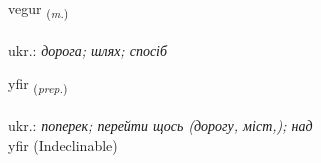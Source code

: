 \documentclass[frontgrid, backgrid]{flacards}\usepackage[]{graphicx}\usepackage[]{xcolor}
\begin{document}
\renewcommand{\flhead}{\vskip5pt \fboxsep=0pt {\small\bfseries\footnotesize Nafnorð | іменник}}
\renewcommand{\fcfoot}{\vskip5pt \fboxsep=0pt \hspace{2pt}{\small\bfseries\footnotesize 1K}}

\renewcommand{\blhead}{\vskip5pt {\small\bfseries\footnotesize Nafnorð | іменник }}
\renewcommand{\bcfoot}{\vskip5pt \hspace{2pt}{\small\bfseries\footnotesize 1K}}


{vegur \small{\textsubscript{(\textit{m.})}} \\[1ex] %
\textphonetic{[vɛːɣʏr]} \\
ukr.: \emph{дорога; шлях; спосіб} \\  [2ex]
\renewcommand*{\arraystretch}{0.8}
}


\renewcommand{\flhead}{\vskip5pt \fboxsep=0pt {\small\bfseries\footnotesize Forsetning | прийменник}}
\renewcommand{\fcfoot}{\vskip5pt \fboxsep=0pt \hspace{2pt}{\small\bfseries\footnotesize 1K}}

\renewcommand{\blhead}{\vskip5pt {\small\bfseries\footnotesize Forsetning | прийменник }}
\renewcommand{\bcfoot}{\vskip5pt \hspace{2pt}{\small\bfseries\footnotesize 1K}}


{yfir \small{\textsubscript{(\textit{prep.})}} \\[1ex]
\textphonetic{[ɪːvɪr]} \\
ukr.: \emph{поперек; перейти щось (дорогу, міст,); над} \\  [2ex]
yfir (Indeclinable)}

\renewcommand{\flhead}{\vskip5pt \fboxsep=0pt {\small\bfseries\footnotesize Fornafn | займенник}}
\renewcommand{\fcfoot}{\vskip5pt \fboxsep=0pt \hspace{2pt}{\small\bfseries\footnotesize 1K}}
\end{document}
